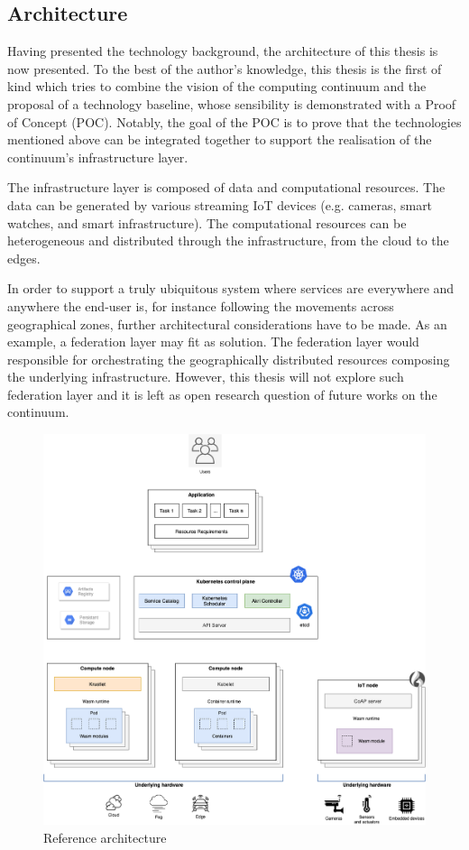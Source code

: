 \subsection{Architecture}

Having presented the technology background, the architecture of this thesis is now presented. To the best of the author's knowledge, this thesis is the first of kind which tries to combine the vision of the computing continuum and the proposal of a technology baseline, whose sensibility is demonstrated with a Proof of Concept (POC). Notably, the goal of the POC is to prove that the technologies mentioned above can be integrated together to support the realisation of the continuum's infrastructure layer. 

The infrastructure layer is composed of data and computational resources. The data can be generated by various streaming IoT devices (e.g. cameras, smart watches, and smart infrastructure). The computational resources can be heterogeneous and distributed through the infrastructure, from the cloud to the edges.

In order to support a truly ubiquitous system where services are everywhere and anywhere the end-user is, for instance following the movements across geographical zones, further architectural considerations have to be made. As an example, a federation layer may fit as solution. The federation layer would responsible for orchestrating the geographically distributed resources composing the underlying infrastructure. However, this thesis will not explore such federation layer and it is left as open research question of future works on the continuum.

\begin{figure}[h]
\centering
\includegraphics[width=\columnwidth]{figures/architecture}
\caption{Reference architecture \label{fig:architecture}}
\end{figure}

